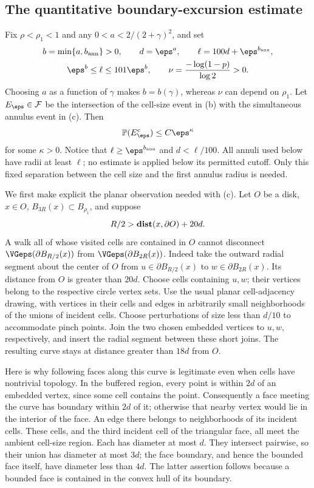 \subsection{The quantitative boundary-excursion estimate}
Fix $\rho<\rho_1<1$ and any
$0<a<2/(2+\gamma)^2$, and set
\begin{equation}\label{eq:l36-exponents}
 \begin{gathered}
 b=\min\{a,b_{\rm ann}\}>0,\qquad d=\eps^a,\qquad
 \ell=100d+\eps^{b_{\rm ann}},\\
 \eps^b\le\ell\le101\eps^b,\qquad
 \nu=\frac{-\log(1-p)}{\log2}>0.
 \end{gathered}
\end{equation}
Choosing $a$ as a function of $\gamma$ makes $b=b(\gamma)$,
whereas $\nu$ can depend on $\rho_1$.
Let $E_\eps\in\mathcal F$ be the intersection of the cell-size event
in (b) with the simultaneous annulus event in (c). Then
\[
 \mathbb{P}(E_\eps^c)\le C\eps^\kappa
\]
for some $\kappa>0$. Notice that $\ell\ge\eps^{b_{\rm ann}}$
and $d<\ell/100$. All annuli used below have radii at least
$\ell$; no estimate is applied below its permitted cutoff.
Only this fixed separation between the cell size and
the first annulus radius is needed.

We first make explicit the planar observation needed with (c).
Let $O$ be a disk, $x\in O$, $B_{3R}(x)\subset B_{\rho_1}$,
and suppose
\[
 R/2>\mathop{\bf dist{}}(x,\partial O)+20d.
\]
A walk all of whose visited cells are contained in $O$ cannot
disconnect $\VGeps(\partial B_{R/2}(x))$ from
$\VGeps(\partial B_{2R}(x))$.
Indeed take the outward radial segment about the center of
$O$ from $u\in\partial B_{R/2}(x)$ to
$w\in\partial B_{2R}(x)$. Its distance from $O$ is greater
than $20d$. Choose cells containing $u,w$; their vertices
belong to the respective circle vertex sets.
Use the usual planar cell-adjacency drawing, with vertices
in their cells and edges in arbitrarily small neighborhoods
of the unions of incident cells. Choose perturbations of
size less than $d/10$ to accommodate pinch points.
Join the two chosen embedded vertices to $u,w$, respectively,
and insert the radial segment between these short joins.
The resulting curve stays at distance greater than $18d$
from $O$.

Here is why following faces along this curve is legitimate
even when cells have nontrivial topology. In the buffered
region, every point is within $2d$ of an embedded vertex,
since some cell contains the point. Consequently a face
meeting the curve has boundary within $2d$ of it; otherwise
that nearby vertex would lie in the interior of the face.
An edge there belongs to neighborhoods of its incident cells.
These cells, and the third incident cell of the triangular
face, all meet the ambient cell-size region. Each has
diameter at most $d$. They intersect pairwise, so their
union has diameter at most $3d$; the face boundary, and
hence the bounded face itself, have diameter less than $4d$.
The latter assertion follows because a bounded face is
contained in the convex hull of its boundary.

